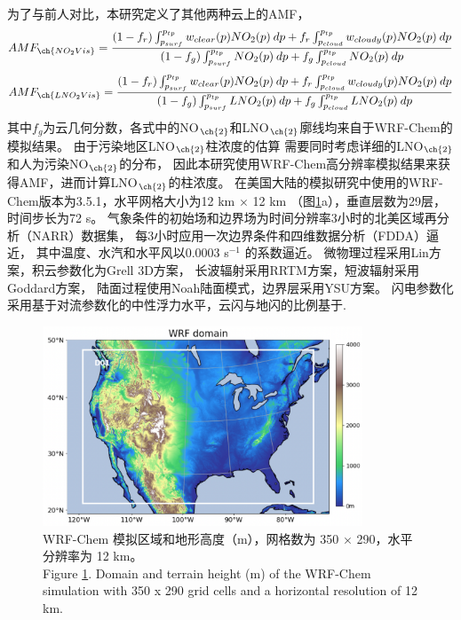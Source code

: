 为了与前人对比，本研究定义了其他两种云上的AMF，
\begin{equation} \label{eq:AMF_NO2Vis}
AMF_{\ch{NO_2Vis}} = \frac{(1-f_r) \int_{p_{surf}}^{p_{tp}} w_{clear}(p) NO_2(p) \: dp + f_r \int_{p_{cloud}}^{p_{tp}} w_{cloudy}(p) NO_2(p) \: dp}{(1-f_g) \int_{p_{surf}}^{p_{tp}} NO_2(p) \: dp + f_g \int_{p_{cloud}}^{p_{tp}} NO_2(p) \: dp}
\end{equation}
\begin{equation} \label{eq:AMF_LNO2Vis}
AMF_{\ch{LNO_2Vis}} = \frac{(1-f_r) \int_{p_{surf}}^{p_{tp}} w_{clear}(p) NO_2(p) \: dp + f_r \int_{p_{cloud}}^{p_{tp}} w_{cloudy}(p) NO_2(p) \: dp}{(1-f_g) \int_{p_{surf}}^{p_{tp}} LNO_2(p) \: dp + f_g \int_{p_{cloud}}^{p_{tp}} LNO_2(p) \: dp}
\end{equation}
其中$f_g$为云几何分数，各式中的NO$_{\ch{2}}$和LNO$_{\ch{2}}$廓线均来自于WRF-Chem的模拟结果。
由于污染地区LNO$_{\ch{2}}$柱浓度的估算
需要同时考虑详细的LNO$_{\ch{2}}$和人为污染NO$_{\ch{2}}$的分布，
因此本研究使用WRF-Chem高分辨率模拟结果来获得AMF，进而计算LNO$_{\ch{2}}$的柱浓度。
在美国大陆的模拟研究中使用的WRF-Chem版本为3.5.1，水平网格大小为12 km $\times$ 12 km （图\ref{fig:us_domain}a），垂直层数为29层，时间步长为72 s。
气象条件的初始场和边界场为时间分辨率3小时的北美区域再分析（NARR）数据集，
每3小时应用一次边界条件和四维数据分析（FDDA）逼近，
其中温度、水汽和水平风以0.0003 s$^{-1}$ 的系数逼近\citep{Laughner.2017}。
微物理过程采用Lin方案\citep{Lin.1983}，积云参数化为Grell 3D方案\citep{Grell.1993a,Grell.2002a}，
长波辐射采用RRTM方案\citep{Iacono.2008}，短波辐射采用Goddard方案，
陆面过程使用Noah陆面模式\citep{Koren.1999}，边界层采用YSU方案\citep{Hong.2006}。
闪电参数化采用基于对流参数化的中性浮力水平\citep{Pickering.1992}，云闪与地闪的比例基于\citet{Boccippio.2001}.

\begin{figure}[H]
\centering
\includegraphics[width=0.85\textwidth]{./figures/us_domain.png}
\caption{WRF-Chem 模拟区域和地形高度（m），网格数为 350 $\times$ 290，水平分辨率为 12 km。 \\
Figure \ref{fig:us_domain}. Domain and terrain height (m) of the WRF-Chem simulation with 350 x 290 grid cells and a horizontal resolution of 12 km.}
\label{fig:us_domain}
\end{figure}

